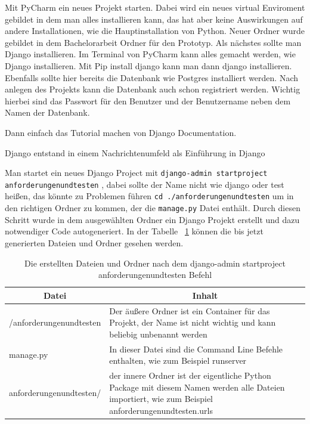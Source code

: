 \documentclass[11pt,a4paper]{report}
\begin{document}
Mit PyCharm ein neues Projekt starten. Dabei wird ein neues virtual Enviroment gebildet in dem man alles installieren kann, das hat aber keine Auswirkungen auf andere Installationen, wie die Hauptinstallation von Python. Neuer Ordner wurde gebildet in dem Bachelorarbeit Ordner für den Prototyp. Als nächstes sollte man Django installieren. Im Terminal von PyCharm kann alles gemacht werden, wie Django installieren. Mit Pip install django kann man dann django installieren. Ebenfalls sollte hier bereits die Datenbank wie Postgres installiert werden. Nach anlegen des Projekts kann die Datenbank auch schon registriert werden. Wichtig hierbei sind das Passwort für den Benutzer und der Benutzername neben dem Namen der Datenbank.

Dann einfach das Tutorial machen von Django Documentation.

Django entstand in einem Nachrichtenumfeld als Einführung in Django

Man startet ein neues Django Project mit 
\verb|django-admin startproject anforderungenundtesten|
, dabei sollte der Name nicht wie django oder test heißen, das könnte zu Problemen führen \verb|cd ./anforderungenundtesten| um in den richtigen Ordner zu kommen, der die \verb|manage.py|  Datei enthält. Durch diesen Schritt wurde in dem ausgewählten Ordner ein Django Projekt erstellt und dazu notwendiger Code autogeneriert. In der Tabelle ~\ref{tab:AutoCode} können die bis jetzt generierten Dateien und Ordner gesehen werden.


\begin{table}
\centering
\begin{tabular}{|p{}|p{}|}
\hline
\multicolumn{1}{|c|}{\textbf{Datei}} & 
\multicolumn{1}{|c|}{\textbf{Inhalt}} \\\hline
/anforderungenundtesten & Der äußere Ordner ist ein Container für das Projekt, der Name ist nicht wichtig und kann beliebig unbenannt werden\\\hline
manage.py     & In dieser Datei sind die Command Line Befehle enthalten, wie zum Beispiel runserver \\\hline
anforderungenundtesten/    & der innere Ordner ist der eigentliche Python Package mit diesem Namen werden alle Dateien importiert, wie zum Beispiel anforderungenundtesten.urls \\\hline   
\end{tabular}
\caption{Die erstellten Dateien und Ordner nach dem django-admin startproject anforderungenundtesten Befehl}
\label{tab:AutoCode}
\end{table}
\end{document}
